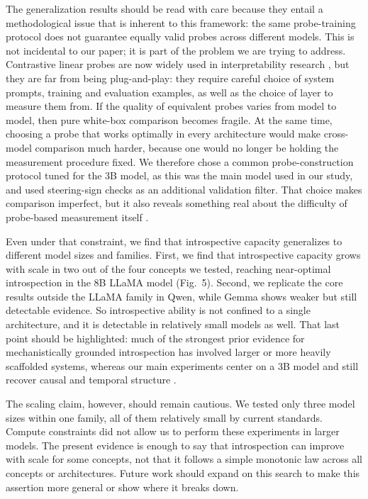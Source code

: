 \documentclass[10pt]{article}
\begin{document}
The generalization results should be read with care because they entail a methodological issue that is inherent to this framework: the same probe-training protocol does not guarantee equally valid probes across different models.
This is not incidental to our paper; it is part of the problem we are trying to address.
Contrastive linear probes are now widely used in interpretability research \citep{AlainBengio2018, Kim2018, Burns2022, GurneeTegmark2023, AzariaMitchell2023, Zou2023}, but they are far from being plug-and-play: they require careful choice of system prompts, training and evaluation examples, as well as the choice of layer to measure them from.
If the quality of equivalent probes varies from model to model, then pure white-box comparison becomes fragile.
At the same time, choosing a probe that works optimally in every architecture would make cross-model comparison much harder, because one would no longer be holding the measurement procedure fixed.
We therefore chose a common probe-construction protocol tuned for the 3B model, as this was the main model used in our study, and used steering-sign checks as an additional validation filter.
That choice makes comparison imperfect, but it also reveals something real about the difficulty of probe-based measurement itself \citep{Belinkov2022, Pimentel2020}.

Even under that constraint, we find that introspective capacity generalizes to different model sizes and families.
First, we find that introspective capacity grows with scale in two out of the four concepts we tested, reaching near-optimal introspection in the 8B LLaMA model (Fig.~5).
Second, we replicate the core results outside the LLaMA family in Qwen, while Gemma shows weaker but still detectable evidence.
So introspective ability is not confined to a single architecture, and it is detectable in relatively small models as well.
That last point should be highlighted: much of the strongest prior evidence for mechanistically grounded introspection has involved larger or more heavily scaffolded systems, whereas our main experiments center on a 3B model and still recover causal and temporal structure \citep{JiAn2025, Rivera2025, Lindsey2026}.

The scaling claim, however, should remain cautious.
We tested only three model sizes within one family, all of them relatively small by current standards. Compute constraints did not allow us to perform these experiments in larger models.
The present evidence is enough to say that introspection can improve with scale for some concepts, not that it follows a simple monotonic law across all concepts or architectures.
Future work should expand on this search to make this assertion more general or show where it breaks down.
\end{document}
